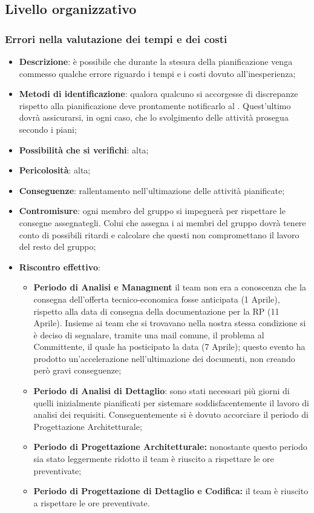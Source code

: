 	\subsection{Livello organizzativo}
		\subsubsection{Errori nella valutazione dei tempi e dei costi}
		\begin{itemize}
			\item \textbf{Descrizione}: è possibile che durante la stesura della pianificazione venga commesso qualche errore riguardo i tempi e i costi dovuto all'inesperienza;
			\item \textbf{Metodi di identificazione}: qualora qualcuno si accorgesse di discrepanze rispetto alla pianificazione deve prontamente notificarlo al \RES{}. Quest'ultimo dovrà assicurarsi, in ogni caso, che lo svolgimento delle attività prosegua secondo i piani;
			\item \textbf{Possibilità che si verifichi}: alta;
			\item \textbf{Pericolosità}: alta;
			\item \textbf{Conseguenze}: rallentamento nell'ultimazione delle attività pianificate;
			\item \textbf{Contromisure}: ogni membro del gruppo si impegnerà per rispettare le consegne assegnategli. Colui che assegna i  ai membri del gruppo dovrà tenere conto di possibili ritardi e calcolare che questi non compromettano il lavoro del resto del gruppo;
			\item \textbf{Riscontro effettivo}:
			\begin{itemize}
				 \item \textbf{Periodo di Analisi e Managment} il team non era a conoscenza che la consegna dell'offerta tecnico-economica fosse anticipata (1 Aprile), rispetto alla data di consegna della documentazione per la RP (11 Aprile). Insieme ai team che si trovavano nella nostra stessa condizione si è deciso di segnalare, tramite una mail comune, il problema al Committente, il quale ha posticipato la data (7 Aprile); questo evento ha prodotto un'accelerazione nell'ultimazione dei documenti, non creando però gravi conseguenze;
				 \item \textbf{Periodo di Analisi di Dettaglio}: sono stati necessari più giorni di quelli inizialmente pianificati per sistemare soddisfacentemente il lavoro di analisi dei requisiti. Conseguentemente si è dovuto accorciare il periodo di Progettazione Architetturale;
				 \item \textbf{Periodo di Progettazione Architetturale:} nonostante questo periodo sia stato leggermente ridotto il team è riuscito a rispettare le ore preventivate;
             \item \textbf{Periodo di Progettazione di Dettaglio e Codifica:} il team è riuscito a rispettare le ore preventivate.
			\end{itemize}
		\end{itemize}


